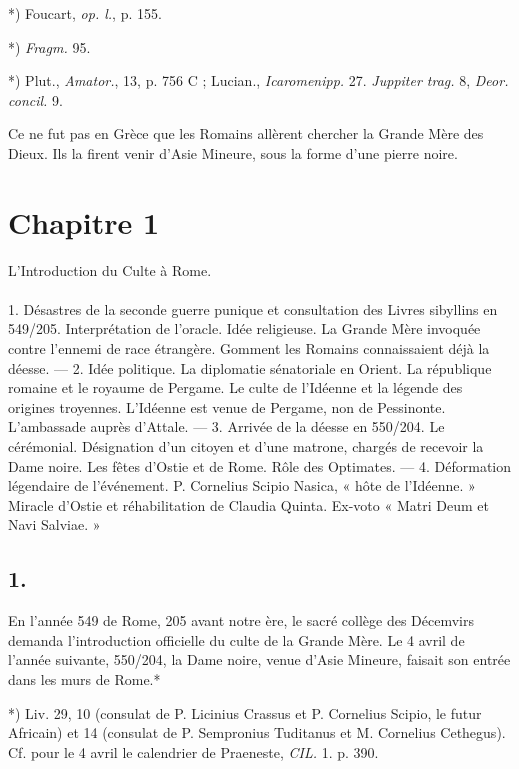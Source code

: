 \documentclass[a4paper, 11pt, oneside, polutonikogreek, french]{article}
\begin{document}
*) Foucart, \emph{op. l.}, p. 155.

*) \emph{Fragm.} 95.

*) Plut., \emph{Amator.}, 13, p. 756 C ; Lucian., \emph{Icaromenipp.} 27. \emph{Juppiter trag.} 8, \emph{Deor. concil.} 9.

Ce ne fut pas en Grèce que les Romains allèrent chercher la Grande Mère des Dieux. Ils la firent venir d'Asie Mineure, sous la forme d'une pierre noire.
\clearpage
\section{Chapitre 1}
\begin{center}
L'Introduction du Culte à Rome.
\end{center}
\paragraph{}
1. Désastres de la seconde guerre punique et consultation des Livres sibyllins en 549/205. Interprétation de l'oracle. Idée religieuse. La Grande Mère invoquée contre l'ennemi de race étrangère. Gomment les Romains connaissaient déjà la déesse. --- 2. Idée politique. La diplomatie sénatoriale en Orient. La république romaine et le royaume de Pergame. Le culte de l'Idéenne et la légende des origines troyennes. L'Idéenne est venue de Pergame, non de Pessinonte. L'ambassade auprès d'Attale. --- 3. Arrivée de la déesse en 550/204. Le cérémonial. Désignation d'un citoyen et d'une matrone, chargés de recevoir la Dame noire. Les fêtes d'Ostie et de Rome. Rôle des Optimates. --- 4. Déformation légendaire de l'événement. P. Cornelius Scipio Nasica, « hôte de l'Idéenne. » Miracle d'Ostie et réhabilitation de Claudia Quinta. Ex-voto « Matri Deum et Navi Salviae. »

\subsection{1.}

En l'année 549 de Rome, 205 avant notre ère, le sacré collège des Décemvirs demanda l'introduction officielle du culte de la Grande Mère. Le 4 avril de l'année suivante, 550/204, la Dame noire, venue d'Asie Mineure, faisait son entrée dans les murs de Rome.*

*) Liv.  29, 10 (consulat de P. Licinius Crassus et P. Cornelius Scipio, le futur Africain) et 14 (consulat de P. Sempronius Tuditanus et M. Cornelius Cethegus). Cf. pour le 4 avril le calendrier de Praeneste, \emph{CIL.} 1. p. 390.
\end{document}
